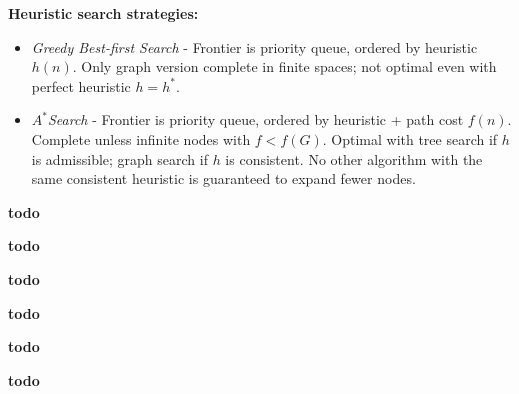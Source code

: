 \documentclass[a4paper,10pt,twocolumn]{article}
\begin{document}
\begin{tcolorbox}[title=Heuristic Search, module]
    \textbf{Heuristic search strategies:}
    \begin{itemize}
        \item \textit{Greedy Best-first Search} - Frontier is priority queue, ordered by heuristic $h(n)$. Only graph version complete in finite spaces; not optimal even with perfect heuristic $h = h^*$.
        \item $A^*$\textit{Search} - Frontier is priority queue, ordered by heuristic + path cost $f(n)$. Complete unless infinite nodes with $f < f(G)$. Optimal with tree search if $h$ is admissible; graph search if $h$ is consistent. No other algorithm with the same consistent heuristic is guaranteed to expand fewer nodes.
    \end{itemize}

\end{tcolorbox}

\begin{tcolorbox}[title=Game Search, module]
    \textbf{todo}
\end{tcolorbox}

\begin{tcolorbox}[title=Constraint Satisfaction, module]
    \textbf{todo}
\end{tcolorbox}

\begin{tcolorbox}[title=Logic, module]
    \textbf{todo}
\end{tcolorbox}

\begin{tcolorbox}[title={Probability \& Uncertainty, Bayesian Networks}, module]
    \textbf{todo}
\end{tcolorbox}

\begin{tcolorbox}[title={Intro to ML, Linear Regression, kNN}, module]
    \textbf{todo}
\end{tcolorbox}

\begin{tcolorbox}[title={Decision Trees and Neural Networks}, module]
    \textbf{todo}
\end{tcolorbox}
\end{document}
